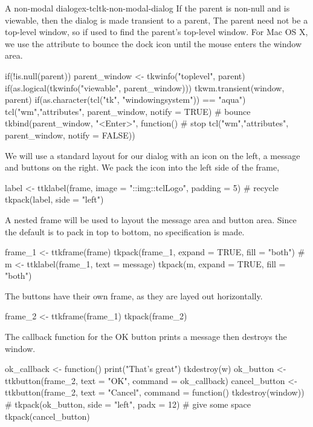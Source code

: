 \begin{example}{A non-modal dialog}{ex-tcltk-non-modal-dialog}
If the parent is non-null and is viewable, then the dialog is made
transient to a parent, The parent need not be a top-level window, so
 if used to find the parent's top-level window. For
Mac OS X, we use the  attribute to bounce the dock icon
until the mouse enters the window area.

\begin{Schunk}
\begin{Sinput}
 if(!is.null(parent)) {
   parent_window <- tkwinfo("toplevel", parent)
   if(as.logical(tkwinfo("viewable", parent_window))) {
     tkwm.transient(window, parent)
     if(as.character(tcl("tk", "windowingsystem")) == "aqua") {
       tcl("wm","attributes", parent_window, notify = TRUE) # bounce
       tkbind(parent_window, "<Enter>", function()        # stop
              tcl("wm","attributes", parent_window, notify = FALSE)) 
     }
   }
 }
\end{Sinput}
\end{Schunk}

We will use a standard layout for our dialog with an icon on the left,
a message and buttons on the right. We pack the icon into the left side of the frame,
\begin{Schunk}
\begin{Sinput}
 label <- ttklabel(frame, image = "::img::tclLogo", padding = 5) # recycle
 tkpack(label, side = "left")
\end{Sinput}
\end{Schunk}

A nested frame will be used to layout the message area and button area. Since the  default is to pack in top to bottom, no  specification is made.
\begin{Schunk}
\begin{Sinput}
 frame_1 <- ttkframe(frame)
 tkpack(frame_1, expand = TRUE, fill = "both")
 #
 m <- ttklabel(frame_1, text = message)
 tkpack(m, expand = TRUE, fill = "both")
\end{Sinput}
\end{Schunk}

The buttons have their own frame, as they are layed out horizontally. 
\begin{Schunk}
\begin{Sinput}
 frame_2 <- ttkframe(frame_1)
 tkpack(frame_2)
\end{Sinput}
\end{Schunk}
%
The callback function for the OK button prints a message then destroys the window.
\begin{Schunk}
\begin{Sinput}
 ok_callback <- function() {
   print("That's great")
   tkdestroy(w)
 }
 ok_button <- ttkbutton(frame_2, text = "OK", command = ok_callback)
 cancel_button <- ttkbutton(frame_2, text = "Cancel", 
                           command = function() tkdestroy(window))
 #
 tkpack(ok_button, side = "left", padx = 12)  # give some space
 tkpack(cancel_button)
\end{Sinput}
\end{Schunk}
%


\end{example}
